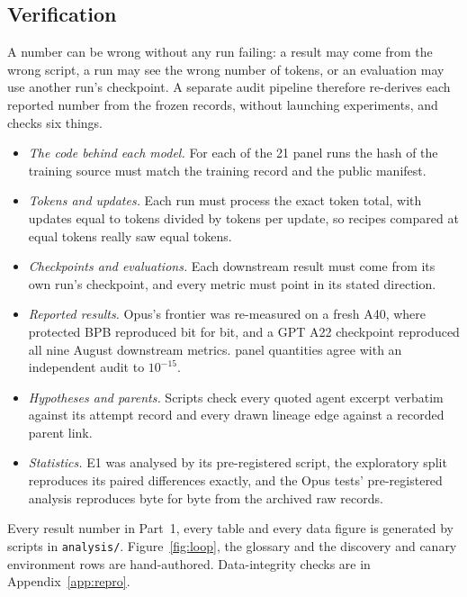 \documentclass{article}
\newif\ifshowhumanmarkers \showhumanmarkersfalse
\newcommand{\humantag}[1]{{\color{humanframe}\sffamily\scriptsize\bfseries HUMAN AUTHOR MUST REWRITE/VERIFY [#1]}\ }
\newcommand{\humanauthor}[2][]{\ifshowhumanmarkers\begin{humanbox}\humantag{#1}#2\end{humanbox}\else #2\par\fi}
\begin{document}
\subsection{Verification}\label{sec:verification}
\humanauthor[P2-07 r6]{A number can be wrong without any run failing: a result may come from the wrong script, a run may see the wrong number of tokens, or an evaluation may use another run's checkpoint. A separate audit pipeline therefore re-derives each reported number from the frozen records, without launching experiments, and checks six things.
{\setlength{\leftmargini}{1.2em}\begin{itemize}\setlength{\itemsep}{0pt}\setlength{\parskip}{0pt}\setlength{\topsep}{1pt}
\item \emph{The code behind each model.} For each of the 21 panel runs the hash of the training source must match the training record and the public manifest.
\item \emph{Tokens and updates.} Each run must process the exact token total, with updates equal to tokens divided by tokens per update, so recipes compared at equal tokens really saw equal tokens.
\item \emph{Checkpoints and evaluations.} Each downstream result must come from its own run's checkpoint, and every metric must point in its stated direction.
\item \emph{Reported results.} Opus's frontier was re-measured on a fresh A40, where protected BPB reproduced bit for bit, and a GPT A22 checkpoint reproduced all nine August downstream metrics. \CRNCrossChecked{} panel quantities agree with an independent audit to $10^{-15}$.
\item \emph{Hypotheses and parents.} Scripts check every quoted agent excerpt verbatim against its attempt record and every drawn lineage edge against a recorded parent link.
\item \emph{Statistics.} E1 was analysed by its pre-registered script, the exploratory split reproduces its paired differences exactly, and the Opus tests' pre-registered analysis reproduces byte for byte from the archived raw records.
\end{itemize}}
Every result number in Part~1, every table and every data figure is generated by scripts in \texttt{analysis/}. Figure~\ref{fig:loop}, the glossary and the discovery and canary environment rows are hand-authored. Data-integrity checks are in Appendix~\ref{app:repro}.}
\end{document}
